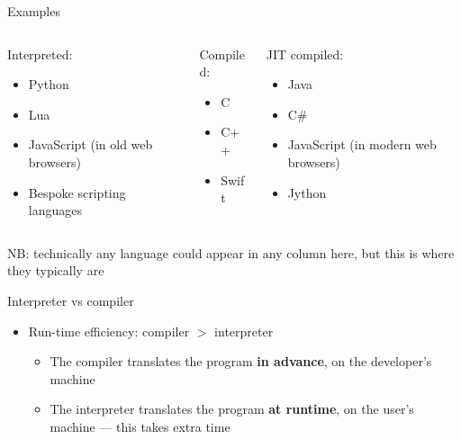\begin{frame}{Examples}
	\begin{columns}[t,onlytextwidth]
		\begin{column}{0.3\textwidth}
		    Interpreted:
		    \begin{itemize}
		        \item Python
		        \item Lua
						\item JavaScript (in old web browsers)
		        \item Bespoke scripting languages
		    \end{itemize}
		\end{column} \pause
		\begin{column}{0.3\textwidth}
		    Compiled:
		    \begin{itemize}
		        \item C
		        \item C++
		        \item Swift
		    \end{itemize}
		\end{column} \pause
		\begin{column}{0.3\textwidth}
		    JIT compiled:
		    \begin{itemize}
		        \item Java
		        \item C\#
		        \item JavaScript (in modern web browsers)
		        \item Jython
		    \end{itemize}
		\end{column}
	\end{columns}
	\pause NB: technically any language could appear in any column here, but this is where they typically are
\end{frame}

\begin{frame}{Interpreter vs compiler}
    \begin{itemize}
        \item Run-time efficiency: compiler $>$ interpreter \pause
        \begin{itemize}
            \item The compiler translates the program \textbf{in advance}, on the developer's machine \pause
            \item The interpreter translates the program \textbf{at runtime}, on the user's machine --- this takes extra time
        \end{itemize}
    \end{itemize}
\end{frame}


